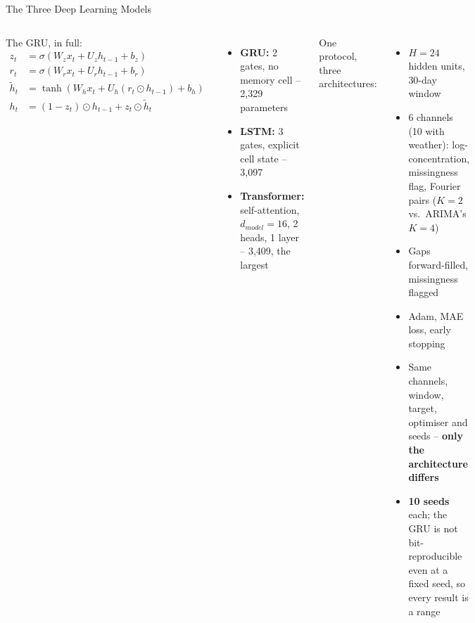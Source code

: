 \documentclass[12pt,aspectratio=169]{beamer}
\begin{document}
\begin{frame}{The Three Deep Learning Models}
  \begin{columns}
    \footnotesize
    The GRU, in full:
    \begin{align*}
      z_t &= \sigma(W_z x_t + U_z h_{t-1} + b_z)\\
      r_t &= \sigma(W_r x_t + U_r h_{t-1} + b_r)\\
      \tilde h_t &= \tanh(W_h x_t + U_h(r_t\odot h_{t-1}) + b_h)\\
      h_t &= (1-z_t)\odot h_{t-1} + z_t\odot \tilde h_t
    \end{align*}
    \vspace{-6pt}
    \begin{itemize}
      \item \textbf{GRU:} 2 gates, no memory cell -- 2{,}329 parameters
      \item \textbf{LSTM:} 3 gates, explicit cell state -- 3{,}097
      \item \textbf{Transformer:} self-attention, $d_{model}=16$, 2
        heads, 1 layer -- 3{,}409, the largest
    \end{itemize}
    \footnotesize
    One protocol, three architectures:
    \begin{itemize}
      \item $H=24$ hidden units, 30-day window
      \item 6 channels (10 with weather): log-concentration, missingness
        flag, Fourier pairs ($K=2$ vs.\ ARIMA's $K=4$)
      \item Gaps forward-filled, missingness flagged
      \item Adam, MAE loss, early stopping
      \item Same channels, window, target, optimiser and seeds --
        \textbf{only the architecture differs}
      \item \textbf{10 seeds} each; the GRU is not bit-reproducible even
        at a fixed seed, so every result is a range
    \end{itemize}
  \end{columns}
\end{frame}
\end{document}
